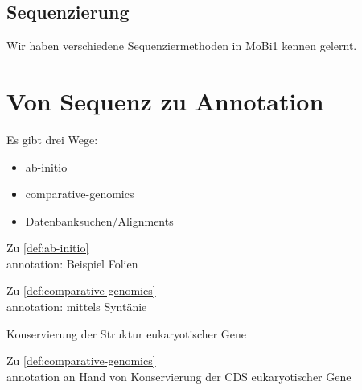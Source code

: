 \subsection{Sequenzierung}\label{subsec:sequenzierung}
Wir haben verschiedene Sequenziermethoden in MoBi1 kennen gelernt.



 \newpage

\section{Von Sequenz zu Annotation}\label{sec:von-sequenz-zu-annotation}
Es gibt drei Wege:
\begin{itemize}
    \item \gls{ab-initio}
    \item \gls{comparative-genomics}
    \item Datenbanksuchen/Alignments
\end{itemize}


\begin{bsp}
    Zu \autoref{def:ab-initio} \\
    \gls{annotation}: Beispiel Folien %
\end{bsp}

\begin{bsp}
    Zu \autoref{def:comparative-genomics} \\
    \gls{annotation}: mittels Syntänie %
\end{bsp}

\begin{bsp}
    Konservierung der Struktur eukaryotischer
    Gene %
\end{bsp}

\begin{bsp}
    Zu \autoref{def:comparative-genomics} \\
    \gls{annotation} an Hand von Konservierung
    der CDS eukaryotischer Gene %
\end{bsp}



